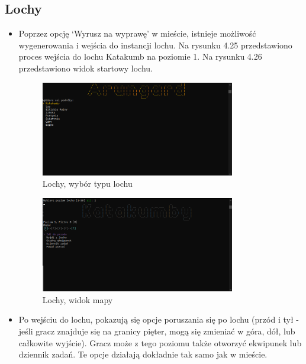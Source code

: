 \subsection{Lochy}
\begin{itemize}
        \item Poprzez opcję `Wyrusz na wyprawę' w mieście, istnieje możliwość wygenerowania i wejścia do instancji lochu.
        Na rysunku 4.25 przedstawiono proces wejścia do lochu Katakumb na poziomie 1. Na rysunku 4.26 przedstawiono widok startowy lochu.
            \begin{figure}[H]
                \centering
                \includegraphics[width=0.8\textwidth]{figures/warstwa_uzytkowa/lochy_1.png}
                \caption{Lochy, wybór typu lochu}
                \label{fig:dungeons_1}
            \end{figure}
            \begin{figure}[H]
                \centering
                \includegraphics[width=0.8\textwidth]{figures/warstwa_uzytkowa/lochy_2.png}
                \caption{Lochy, widok mapy}
                \label{fig:dungeons_2}
            \end{figure}
        \item Po wejściu do lochu, pokazują się opcje poruszania się po lochu 
        (przód i tył - jeśli gracz znajduje się na granicy pięter, mogą się zmieniać w góra, dół, lub całkowite wyjście).
        Gracz może z tego poziomu także otworzyć ekwipunek lub dziennik zadań. Te opcje działają dokładnie tak samo jak w mieście.

\end{itemize}
